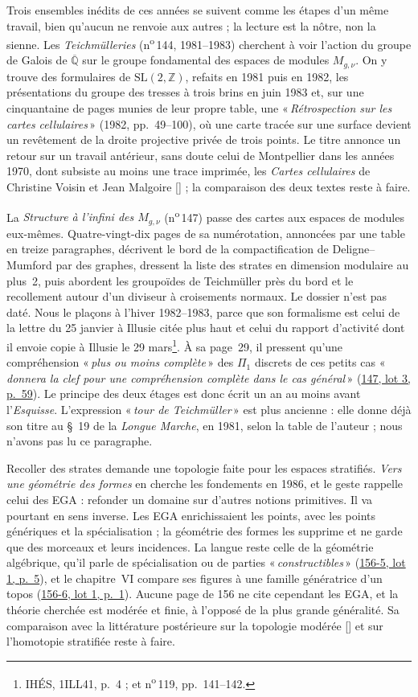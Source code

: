 \documentclass[11pt]{amsart}
\makeatletter
\newcommand{\q}[1]{«\,\textit{#1}\,»}
\newcommand{\cote}[1]{\mbox{n\textsuperscript{o}\,#1}}
\def\RHM@first#1--#2\@nil{#1}
\DeclareRobustCommand{\lot}[3]{\begingroup\edef\RHM@pdfpage{\the\numexpr\RHM@first#3--\@nil+1\relax}\href{https://grothendieck.umontpellier.fr/#1.pdf\#page=\RHM@pdfpage}{#1, lot #2, p.~#3}\endgroup}
\newcommand{\lot}[3]{\href{https://grothendieck.commutator.io/\##1/#2/p#3}{#1, lot #2, p.~#3}}
\makeatother
\begin{document}
Trois ensembles inédits de ces années se suivent comme les étapes d'un même travail, bien qu'aucun ne renvoie aux autres ; la lecture est la nôtre, non la sienne. Les \emph{Teichmülleries} (\cote{144}, 1981--1983) cherchent à voir l'action du groupe de Galois de $\overline{\mathbb{Q}}$ sur le groupe fondamental des espaces de modules $M_{g,\nu}$. On y trouve des formulaires de $\mathrm{SL}(2,\mathbb{Z})$, refaits en 1981 puis en 1982, les présentations du groupe des tresses à trois brins en juin 1983 et, sur une cinquantaine de pages munies de leur propre table, une \q{Rétrospection sur les cartes cellulaires} (1982, pp.~49--100), où une carte tracée sur une surface devient un revêtement de la droite projective privée de trois points. Le titre annonce un retour sur un travail antérieur, sans doute celui de Montpellier dans les années 1970, dont subsiste au moins une trace imprimée, les \emph{Cartes cellulaires} de Christine Voisin et Jean Malgoire [\citealp{voisinmalgoire1977}] ; la comparaison des deux textes reste à faire.

La \emph{Structure à l'infini des $M_{g,\nu}$} (\cote{147}) passe des cartes aux espaces de modules eux-mêmes. Quatre-vingt-dix pages de sa numérotation, annoncées par une table en treize paragraphes, décrivent le bord de la compactification de Deligne--Mumford par des graphes, dressent la liste des strates en dimension modulaire au plus~2, puis abordent les groupoïdes de Teichmüller près du bord et le recollement autour d'un diviseur à croisements normaux. Le dossier n'est pas daté. Nous le plaçons à l'hiver 1982--1983, parce que son formalisme est celui de la lettre du 25 janvier à Illusie citée plus haut et celui du rapport d'activité dont il envoie copie à Illusie le 29 mars\footnote{IHÉS, 1ILL41, p.~4 ; et \cote{119}, pp.~141--142.}. À sa page~29, il pressent qu'une compréhension \q{plus ou moins complète} des $\Pi_1$ discrets de ces petits cas \q{donnera la clef pour une compréhension complète dans le cas général} (\lot{147}{3}{59}). Le principe des deux étages est donc écrit un an au moins avant l'\emph{Esquisse}. L'expression \q{tour de Teichmüller} est plus ancienne : elle donne déjà son titre au §~19 de la \emph{Longue Marche}, en 1981, selon la table de l'auteur ; nous n'avons pas lu ce paragraphe.

Recoller des strates demande une topologie faite pour les espaces stratifiés. \emph{Vers une géométrie des formes} en cherche les fondements en 1986, et le geste rappelle celui des EGA : refonder un domaine sur d'autres notions primitives. Il va pourtant en sens inverse. Les EGA enrichissaient les points, avec les points génériques et la spécialisation ; la géométrie des formes les supprime et ne garde que des morceaux et leurs incidences. La langue reste celle de la géométrie algébrique, qu'il parle de spécialisation ou de parties \q{constructibles} (\lot{156-5}{1}{5}), et le chapitre~VI compare ses figures à une famille génératrice d'un topos (\lot{156-6}{1}{1}). Aucune page de 156 ne cite cependant les EGA, et la théorie cherchée est modérée et finie, à l'opposé de la plus grande généralité. Sa comparaison avec la littérature postérieure sur la topologie modérée [\citealp{vandendries1998}] et sur l'homotopie stratifiée reste à faire.
\end{document}
